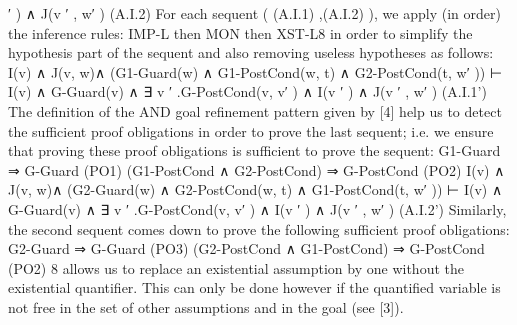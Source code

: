 ′
) ∧ J(v
′
, w′
)
(A.I.2)
For each sequent ( (A.I.1) ,(A.I.2) ), we apply (in order) the inference rules: IMP-L then
MON then XST-L8
in order to simplify the hypothesis part of the sequent and also removing
useless hypotheses as follows:
I(v) ∧ J(v, w)∧
(G1-Guard(w) ∧ G1-PostCond(w, t) ∧ G2-PostCond(t, w′
))
⊢
I(v) ∧ G-Guard(v) ∧ ∃ v
′
.G-PostCond(v, v′
) ∧ I(v
′
) ∧ J(v
′
, w′
)
(A.I.1’)
The definition of the AND goal refinement pattern given by [4] help us to detect the
sufficient proof obligations in order to prove the last sequent; i.e. we ensure that proving
these proof obligations is sufficient to prove the sequent:
G1-Guard ⇒ G-Guard (PO1)
(G1-PostCond ∧ G2-PostCond) ⇒ G-PostCond (PO2)
I(v) ∧ J(v, w)∧
(G2-Guard(w) ∧ G2-PostCond(w, t) ∧ G1-PostCond(t, w′
)) ⊢
I(v) ∧ G-Guard(v) ∧ ∃ v
′
.G-PostCond(v, v′
) ∧ I(v
′
) ∧ J(v
′
, w′
)
(A.I.2’)
Similarly, the second sequent comes down to prove the following sufficient proof obligations:
G2-Guard ⇒ G-Guard (PO3)
(G2-PostCond ∧ G1-PostCond) ⇒ G-PostCond (PO2)
8
allows us to replace an existential assumption by one without the existential quantifier. This can only be
done however if the quantified variable is not free in the set of other assumptions and in the goal (see [3]).